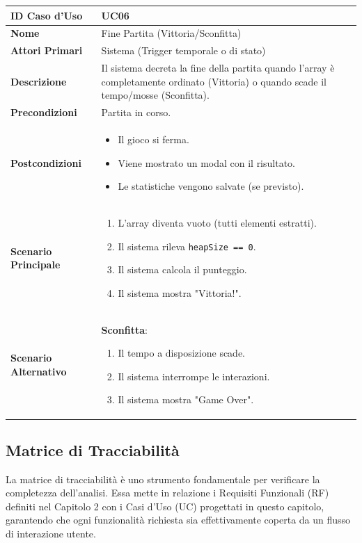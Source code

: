 \documentclass[openany]{theme/uniprthesis}
\begin{document}
\begin{xltabular}{\textwidth}{|l|X|}
\hline
\textbf{ID Caso d'Uso} & UC06 \\
\hline
\textbf{Nome} & Fine Partita (Vittoria/Sconfitta) \\
\hline
\textbf{Attori Primari} & Sistema (Trigger temporale o di stato) \\
\hline
\textbf{Descrizione} & Il sistema decreta la fine della partita quando l'array è completamente ordinato (Vittoria) o quando scade il tempo/mosse (Sconfitta). \\
\hline
\textbf{Precondizioni} & Partita in corso. \\
\hline
\textbf{Postcondizioni} & \begin{itemize}
    \item Il gioco si ferma.
    \item Viene mostrato un modal con il risultato.
    \item Le statistiche vengono salvate (se previsto).
\end{itemize} \\
\hline
\textbf{Scenario Principale} & \begin{enumerate}
    \item L'array diventa vuoto (tutti elementi estratti).
    \item Il sistema rileva \texttt{heapSize == 0}.
    \item Il sistema calcola il punteggio.
    \item Il sistema mostra "Vittoria!".
\end{enumerate} \\
\hline
\textbf{Scenario Alternativo} & \textbf{Sconfitta}:
\begin{enumerate}
    \item Il tempo a disposizione scade.
    \item Il sistema interrompe le interazioni.
    \item Il sistema mostra "Game Over".
\end{enumerate} \\
\hline
\end{xltabular}


\subsection{Matrice di Tracciabilità}
La matrice di tracciabilità è uno strumento fondamentale per verificare la completezza dell'analisi. Essa mette in relazione i Requisiti Funzionali (RF) definiti nel Capitolo 2 con i Casi d'Uso (UC) progettati in questo capitolo, garantendo che ogni funzionalità richiesta sia effettivamente coperta da un flusso di interazione utente.
\end{document}
